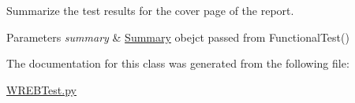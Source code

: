 Summarize the test results for the cover page of the report. 


\begin{DoxyParams}{Parameters}
{\em summary} & \hyperlink{class_w_r_e_b_test_1_1_summary}{Summary} obejct passed from Functional\+Test() \\
\hline
\end{DoxyParams}


The documentation for this class was generated from the following file\+:\begin{DoxyCompactItemize}
\item 
\hyperlink{_w_r_e_b_test_8py}{W\+R\+E\+B\+Test.\+py}\end{DoxyCompactItemize}
